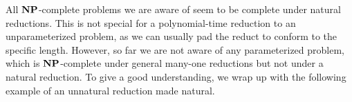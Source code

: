 \documentclass[11pt]{article}
\begin{document}

	
All $\mathbf{NP}$-complete problems we are aware of seem to be complete under natural reductions. This is not special for a polynomial-time reduction to an
unparameterized problem, as we can usually pad the reduct to conform to
the specific length. However, so far we are not aware of any parameterized
problem, which is $\mathbf{NP}$-complete under general many-one reductions but not
under a natural reduction.
To give a good understanding, we wrap up with the following example of an
unnatural reduction made natural.
\end{document}
